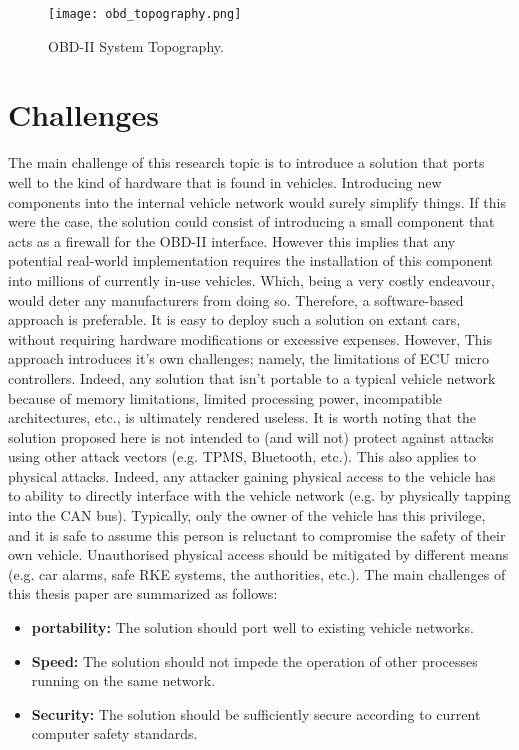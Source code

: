 \begin{figure}[h]
	\centering
	\texttt{[image: obd\_topography.png]}
	\caption{OBD-II System Topography.}
	\label{fig:topography}
\end{figure}
 

\section{Challenges} \label{sec:challenges}
The main challenge of this research topic is to introduce a solution that ports well to the kind of hardware that is found in vehicles. Introducing new components into the internal vehicle network would surely simplify things. If this were the case, the solution could consist of introducing a small component that acts as a firewall for the OBD-II interface. However this implies that any potential real-world implementation requires the installation of this component into millions of currently in-use vehicles. Which, being a very costly endeavour, would deter any manufacturers from doing so. Therefore, a software-based approach is preferable. It is easy to deploy such a solution on extant cars, without requiring hardware modifications or excessive expenses. However, This approach introduces it's own challenges; namely, the limitations of ECU micro controllers. Indeed, any solution that isn't portable to a typical vehicle network because of memory limitations, limited processing power, incompatible architectures, etc., is ultimately rendered useless. It is worth noting that the solution proposed here is not intended to (and will not) protect against attacks using other attack vectors (e.g. TPMS, Bluetooth, etc.). This also applies to physical attacks. Indeed, any attacker gaining physical access to the vehicle has to ability to directly interface with the vehicle network (e.g. by physically tapping into the CAN bus). Typically, only the owner of the vehicle has this privilege, and it is safe to assume this person is reluctant to compromise the safety of their own vehicle. Unauthorised physical access should be mitigated by different means (e.g. car alarms, safe RKE systems, the authorities, etc.). The main challenges of this thesis paper are summarized as follows:

\begin{itemize}
	\item \textbf{portability:} The solution should port well to existing vehicle networks. 
	\item \textbf{Speed:} The solution should not impede the operation of other processes running on the same network.
	\item \textbf{Security:} The solution should be sufficiently secure according to current computer safety standards. 
\end{itemize}

